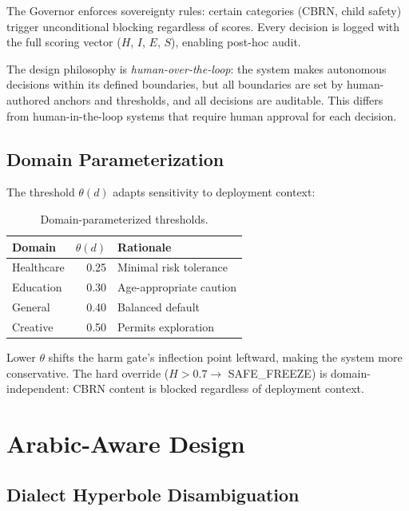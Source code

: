 \documentclass[11pt]{article}
\begin{document}
The Governor enforces sovereignty rules: certain categories (CBRN, child safety) trigger unconditional blocking regardless of scores.
Every decision is logged with the full scoring vector ($H$, $I$, $E$, $S$), enabling post-hoc audit.

The design philosophy is \emph{human-over-the-loop}: the system makes autonomous decisions within its defined boundaries, but all boundaries are set by human-authored anchors and thresholds, and all decisions are auditable.
This differs from human-in-the-loop systems that require human approval for each decision.

\subsection{Domain Parameterization}
\label{sec:domains}

The threshold $\theta(d)$ adapts sensitivity to deployment context:

\begin{table}[h]
\centering
\small
\begin{tabular}{@{}lrl@{}}
\toprule
\textbf{Domain} & $\theta(d)$ & \textbf{Rationale} \\
\midrule
Healthcare & 0.25 & Minimal risk tolerance \\
Education & 0.30 & Age-appropriate caution \\
General & 0.40 & Balanced default \\
Creative & 0.50 & Permits exploration \\
\bottomrule
\end{tabular}
\caption{Domain-parameterized thresholds.}
\label{tab:domains}
\end{table}

Lower $\theta$ shifts the harm gate's inflection point leftward, making the system more conservative.
The hard override ($H > 0.7 \to$ SAFE\_FREEZE) is domain-independent: CBRN content is blocked regardless of deployment context.

\section{Arabic-Aware Design}
\label{sec:arabic}

\subsection{Dialect Hyperbole Disambiguation}
\label{sec:dialect}
\end{document}
